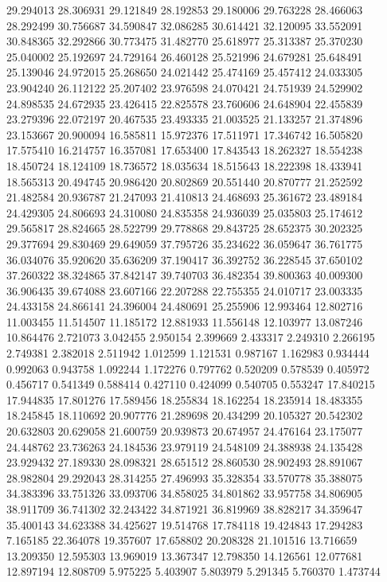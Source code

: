 29.294013
28.306931
29.121849
28.192853
29.180006
29.763228
28.466063
28.292499
30.756687
34.590847
32.086285
30.614421
32.120095
33.552091
30.848365
32.292866
30.773475
31.482770
25.618977
25.313387
25.370230
25.040002
25.192697
24.729164
26.460128
25.521996
24.679281
25.648491
25.139046
24.972015
25.268650
24.021442
25.474169
25.457412
24.033305
23.904240
26.112122
25.207402
23.976598
24.070421
24.751939
24.529902
24.898535
24.672935
23.426415
22.825578
23.760606
24.648904
22.455839
23.279396
22.072197
20.467535
23.493335
21.003525
21.133257
21.374896
23.153667
20.900094
16.585811
15.972376
17.511971
17.346742
16.505820
17.575410
16.214757
16.357081
17.653400
17.843543
18.262327
18.554238
18.450724
18.124109
18.736572
18.035634
18.515643
18.222398
18.433941
18.565313
20.494745
20.986420
20.802869
20.551440
20.870777
21.252592
21.482584
20.936787
21.247093
21.410813
24.468693
25.361672
23.489184
24.429305
24.806693
24.310080
24.835358
24.936039
25.035803
25.174612
29.565817
28.824665
28.522799
29.778868
29.843725
28.652375
30.202325
29.377694
29.830469
29.649059
37.795726
35.234622
36.059647
36.761775
36.034076
35.920620
35.636209
37.190417
36.392752
36.228545
37.650102
37.260322
38.324865
37.842147
39.740703
36.482354
39.800363
40.009300
36.906435
39.674088
23.607166
22.207288
22.755355
24.010717
23.003335
24.433158
24.866141
24.396004
24.480691
25.255906
12.993464
12.802716
11.003455
11.514507
11.185172
12.881933
11.556148
12.103977
13.087246
10.864476
2.721073
3.042455
2.950154
2.399669
2.433317
2.249310
2.266195
2.749381
2.382018
2.511942
1.012599
1.121531
0.987167
1.162983
0.934444
0.992063
0.943758
1.092244
1.172276
0.797762
0.520209
0.578539
0.405972
0.456717
0.541349
0.588414
0.427110
0.424099
0.540705
0.553247
17.840215
17.944835
17.801276
17.589456
18.255834
18.162254
18.235914
18.483355
18.245845
18.110692
20.907776
21.289698
20.434299
20.105327
20.542302
20.632803
20.629058
21.600759
20.939873
20.674957
24.476164
23.175077
24.448762
23.736263
24.184536
23.979119
24.548109
24.388938
24.135428
23.929432
27.189330
28.098321
28.651512
28.860530
28.902493
28.891067
28.982804
29.292043
28.314255
27.496993
35.328354
33.570778
35.388075
34.383396
33.751326
33.093706
34.858025
34.801862
33.957758
34.806905
38.911709
36.741302
32.243422
34.871921
36.819969
38.828217
34.359647
35.400143
34.623388
34.425627
19.514768
17.784118
19.424843
17.294283
7.165185
22.364078
19.357607
17.658802
20.208328
21.101516
13.716659
13.209350
12.595303
13.969019
13.367347
12.798350
14.126561
12.077681
12.897194
12.808709
5.975225
5.403907
5.803979
5.291345
5.760370
1.473744
